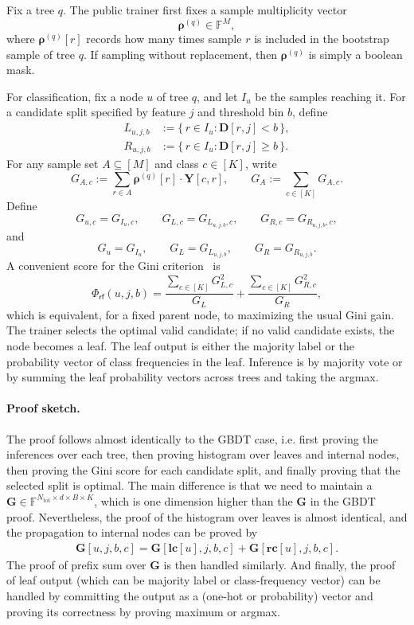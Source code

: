 Fix a tree $q$. The public trainer first fixes a sample multiplicity vector
\[
    \boldsymbol{\rho}^{(q)}\in\mathbb{F}^{M},
\]
where $\boldsymbol{\rho}^{(q)}[r]$ records how many times sample $r$ is included
in the bootstrap sample of tree $q$. If sampling without replacement,
then $\boldsymbol{\rho}^{(q)}$ is simply a boolean mask.

For classification, fix a node $u$ of tree $q$, and let $I_u$ be the samples
reaching it. For a candidate split specified by feature $j$ and threshold bin
$b$, define
\begin{align}
L_{u,j,b} &:= \{\, r\in I_u : \mathbf{D}[r,j] < b \,\},\\
R_{u,j,b} &:= \{\, r\in I_u : \mathbf{D}[r,j] \ge b \,\}.
\end{align}
For any sample set $A\subseteq[M]$ and class $c\in[K]$, write
\[
    G_{A,c}
    :=
    \sum_{r\in A}\boldsymbol{\rho}^{(q)}[r]\cdot \mathbf{Y}[c,r],
    \qquad
    G_A := \sum_{c\in[K]} G_{A,c}.
\]
Define
\[
    G_{u,c}=G_{I_u,c},\qquad
    G_{L,c}=G_{L_{u,j,b},c},\qquad
    G_{R,c}=G_{R_{u,j,b},c},
\]
and
\[
    G_u = G_{I_u},\qquad
    G_L = G_{L_{u,j,b}},\qquad
    G_R = G_{R_{u,j,b}}.
\]
A convenient score for the Gini criterion~\cite{CART1984} is
\begin{equation}\label{eq:rf-gini-score}
    \Phi_{\mathsf{rf}}(u,j,b)
    =
    \frac{\sum_{c\in[K]} G_{L,c}^2}{G_L}
    +
    \frac{\sum_{c\in[K]} G_{R,c}^2}{G_R},
\end{equation}
which is equivalent, for a fixed parent node, to maximizing the usual Gini gain.
The trainer selects the optimal valid candidate; if no valid candidate exists, the node becomes a leaf.  The leaf output is either the majority label or the probability vector of class frequencies in the leaf.  Inference is by majority vote or by summing the leaf probability vectors across trees and taking the argmax.

\paragraph{Proof sketch.}
The proof follows almost identically to the GBDT case,
i.e. first proving the inferences over each tree,
then proving histogram over leaves and internal nodes, then proving the Gini score for each candidate split, and finally proving that the selected split is optimal.
The main difference is that we need to maintain a $\mathbf{G}\in \mathbb{F}^{N_{\mathrm{tot}}\times d\times B\times K}$,
which is one dimension higher than the $\mathbf{G}$ in the GBDT proof.
Nevertheless, the proof of the histogram over leaves is almost identical,
and the propagation to internal nodes can be proved by
\begin{align}
    \mathbf{G}[u,j,b,c] = \mathbf{G}[\mathbf{lc}[u],j,b,c] + \mathbf{G}[\mathbf{rc}[u],j,b,c].
\end{align}
The proof of prefix sum over $\mathbf{G}$ is then handled similarly.
And finally, the proof of leaf output (which can be majority label or class-frequency vector)
can be handled by committing the output as a (one-hot or probability) vector and proving its correctness by proving maximum or argmax.
